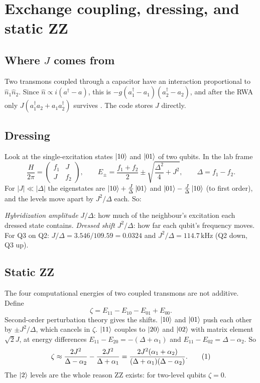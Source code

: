 \documentclass[11pt,a4paper]{article}
\newcommand{\ad}{a^{\dagger}}
\newcommand{\kHz}{\,\mathrm{kHz}}
\newcommand{\eqlab}[1]{\refstepcounter{equation}\tag{\theequation}\label{#1}}
\begin{document}
\section{Exchange coupling, dressing, and static ZZ}\label{sec:exchange}

\subsection{Where \texorpdfstring{\(J\)}{J} comes from}

Two transmons coupled through a capacitor have an interaction proportional to \(\hat n_1\hat n_2\). Since
\(\hat n\propto i(\ad - a)\), this is \(-g(\ad_1 - a_1)(\ad_2 - a_2)\), and after the RWA only
\(J(\ad_1 a_2 + a_1\ad_2)\) survives \cite{krantz2019,blais2021}. The code stores \(J\) directly.

\subsection{Dressing}

Look at the single-excitation states \(\ket{10}\) and \(\ket{01}\) of two qubits. In the lab frame
\[
\frac{H}{2\pi} = \begin{pmatrix} f_1 & J\\ J & f_2\end{pmatrix},\qquad
E_\pm = \frac{f_1+f_2}{2} \pm \sqrt{\frac{\Delta^2}{4}+J^2},\qquad \Delta = f_1-f_2 .
\]
For \(|J|\ll|\Delta|\) the eigenstates are \(\ket{10} + \tfrac{J}{\Delta}\ket{01}\) and
\(\ket{01} - \tfrac{J}{\Delta}\ket{10}\) (to first order), and the levels move apart by \(J^2/\Delta\) each. So:

\begin{keybox}
\emph{Hybridization amplitude} \(J/\Delta\): how much of the neighbour's excitation each dressed state contains.
\emph{Dressed shift} \(J^2/\Delta\): how far each qubit's frequency moves. For Q3 on Q2:
\(J/\Delta = 3.546/109.59 = 0.0324\) and \(J^2/\Delta = 114.7\kHz\) (Q2 down, Q3 up).
\end{keybox}

\subsection{Static ZZ}

The four computational energies of two coupled transmons are not additive. Define
\[
\zeta = E_{11} - E_{10} - E_{01} + E_{00}.
\]
Second-order perturbation theory gives the shifts. \(\ket{10}\) and \(\ket{01}\) push each other by \(\pm J^2/\Delta\),
which cancels in \(\zeta\). \(\ket{11}\) couples to \(\ket{20}\) and \(\ket{02}\) with matrix element \(\sqrt2 J\), at energy
differences \(E_{11}-E_{20} = -(\Delta + \alpha_1)\) and \(E_{11}-E_{02} = \Delta - \alpha_2\). So
\[
\zeta \approx \frac{2J^2}{\Delta-\alpha_2} - \frac{2J^2}{\Delta+\alpha_1}
= \frac{2J^2(\alpha_1+\alpha_2)}{(\Delta+\alpha_1)(\Delta-\alpha_2)} . \eqlab{eq:zz}
\]
The \(\ket{2}\) levels are the whole reason ZZ exists: for two-level qubits \(\zeta = 0\).
\end{document}
